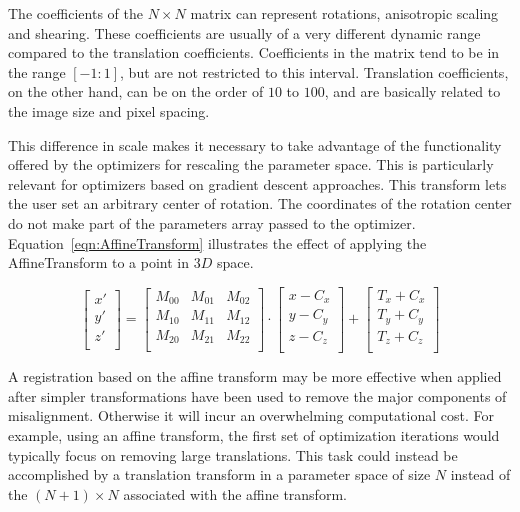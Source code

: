The coefficients of the $N \times N$ matrix can represent rotations,
anisotropic scaling and shearing. These coefficients are usually of a very
different dynamic range compared to the translation
coefficients. Coefficients in the matrix tend to be in the range $[-1:1]$, but
are not restricted to this interval.  Translation coefficients, on the other
hand, can be on the order of $10$ to $100$, and are basically related to the
image size and pixel spacing.

This difference in scale makes it necessary to take advantage of the
functionality offered by the optimizers for rescaling the parameter space. This
is particularly relevant for optimizers based on gradient descent approaches.
This transform lets the user set an arbitrary center of rotation. The
coordinates of the rotation center do not make part of the parameters array
passed to the optimizer. Equation~\ref{eqn:AffineTransform} illustrates the
effect of applying the AffineTransform to a point in $3D$ space.

\begin{equation}
\label{eqn:AffineTransform}
\left[
\begin{array}{c}
x' \\
y' \\
z' \\
\end{array}
\right]
=
\left[
\begin{array}{ccc}
M_{00} & M_{01} & M_{02} \\
M_{10} & M_{11} & M_{12} \\
M_{20} & M_{21} & M_{22} \\
\end{array}
\right]
\cdot
\left[
\begin{array}{c}
x - C_x \\
y - C_y \\
z - C_z \\
\end{array}
\right]
+
\left[
\begin{array}{c}
T_x + C_x \\
T_y + C_y \\
T_z + C_z \\
\end{array}
\right]
\end{equation}


A registration based on the affine transform may be more effective when
applied after simpler transformations have been used to remove the major
components of misalignment. Otherwise it will incur an overwhelming
computational cost. For example, using an affine transform, the first set of
optimization iterations would typically focus on removing large
translations. This task could instead be accomplished by a translation
transform in a parameter space of size $N$ instead of the $(N+1) \times N$
associated with the affine transform.

